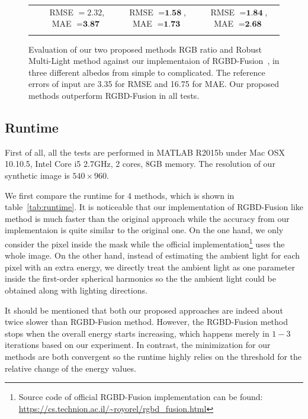 \begin{figure}
{\begin{tabular}{cccc}
& {\small RMSE $= 2.32$, MAE $=\textbf{3.87}$} & {\small RMSE $= \textbf{1.58}$, MAE $=\textbf{1.73}$} & {\small RMSE $= \textbf{1.84}$, MAE $=\textbf{2.68}$} \\
 \\
  \end{tabular}
  }
  \caption{Evaluation of our two proposed methods RGB ratio and Robust Multi-Light method against our implementaion of RGBD-Fusion~\cite{or2015rgbd}, in three different albedos from simple to complicated. The reference errors of input are 3.35 for RMSE and 16.75 for MAE. Our proposed methods outperform RGBD-Fusion in all tests.}
  \label{fig:result_syn_comp}
\end{figure}


\subsection{Runtime}
First of all, all the tests are performed in MATLAB R2015b under Mac OSX 10.10.5, Intel Core i5 2.7GHz, 2 cores, 8GB memory. 
The resolution of our synthetic image is $540\times 960$.

We first compare the runtime for 4 methods, which is shown in table~\ref{tab:runtime}.
It is noticeable that our implementation of RGBD-Fusion like method is much faster than the original approach while the accuracy from our implementaion is quite similar to the original one.
On the one hand, we only consider the pixel inside the mask while the official implementation\footnote{Source code of official RGBD-Fusion implementation can be found: \url{https://cs.technion.ac.il/~royorel/rgbd_fusion.html}} uses the whole image.
On the other hand, instead of estimating the ambient light for each pixel with an extra energy, we directly treat the ambient light as one parameter inside the first-order spherical harmonics so the the ambient light could be obtained along with lighting directions.

It should be mentioned that both our proposed approaches are indeed about twice slower than RGBD-Fusion method. 
However, the RGBD-Fusion method stops when the overall energy starts increasing, which happens merely in $1-3$ iterations based on our experiment.  
In contrast, the minimization for our methods are both convergent so the runtime highly relies on the threshold for the relative change of the energy values.

